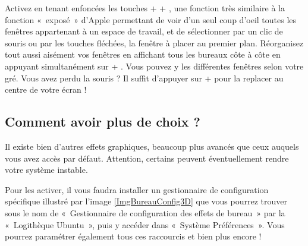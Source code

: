 Activez en tenant enfoncées les touches  +  + , une fonction très similaire à la fonction «~exposé~» d'Apple permettant de voir d'un seul coup d'oeil toutes les fenêtres appartenant à un espace de travail, et de sélectionner par un clic de souris ou par les touches fléchées, la fenêtre à placer au premier plan. Réorganisez tout aussi aisément vos fenêtres en affichant tous les bureaux côte à côte en appuyant simultanément sur  + . Vous pouvez y  les différentes fenêtres selon votre gré.
Vous avez perdu la souris ? Il suffit d'appuyer sur  +  pour la replacer au centre de votre écran !
\subsection{Comment avoir plus de choix ?}
Il existe bien d'autres effets graphiques, beaucoup plus avancés que ceux auquels vous avez accès par défaut. Attention, certains peuvent éventuellement rendre votre système instable.\par
Pour les activer, il vous faudra installer un gestionnaire de configuration spécifique illustré par l'image \ref{ImgBureauConfig3D} que vous pourrez trouver sous le nom de «~Gestionnaire de configuration des effets de bureau~» par la «~Logithèque Ubuntu~», puis y accéder dans «~Système \FlecheDroite Préférences~». Vous pourrez paramétrer également tous ces raccourcis et bien plus encore !\par
{}
